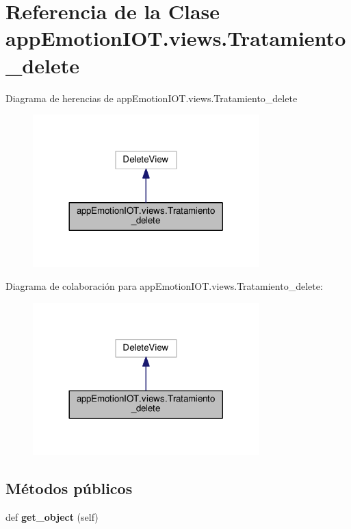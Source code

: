 \hypertarget{classappEmotionIOT_1_1views_1_1Tratamiento__delete}{}\section{Referencia de la Clase app\+Emotion\+I\+O\+T.\+views.\+Tratamiento\+\_\+delete}
\label{classappEmotionIOT_1_1views_1_1Tratamiento__delete}


Diagrama de herencias de app\+Emotion\+I\+O\+T.\+views.\+Tratamiento\+\_\+delete
\nopagebreak
\begin{figure}[H]
\begin{center}
\leavevmode
\includegraphics[width=248pt]{classappEmotionIOT_1_1views_1_1Tratamiento__delete__inherit__graph}
\end{center}
\end{figure}


Diagrama de colaboración para app\+Emotion\+I\+O\+T.\+views.\+Tratamiento\+\_\+delete\+:
\nopagebreak
\begin{figure}[H]
\begin{center}
\leavevmode
\includegraphics[width=248pt]{classappEmotionIOT_1_1views_1_1Tratamiento__delete__coll__graph}
\end{center}
\end{figure}
\subsection*{Métodos públicos}
\begin{DoxyCompactItemize}
\item 
def {\bfseries get\+\_\+object} (self)\hypertarget{classappEmotionIOT_1_1views_1_1Tratamiento__delete_afeb3c45bb49ac9c8a051075050242827}{}\label{classappEmotionIOT_1_1views_1_1Tratamiento__delete_afeb3c45bb49ac9c8a051075050242827}

\end{DoxyCompactItemize}
